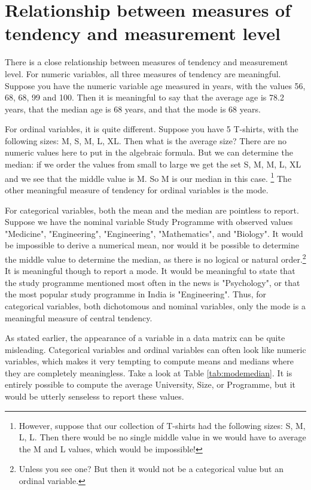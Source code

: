 \documentclass[]{book}\usepackage[]{graphicx}\usepackage[]{color}
\begin{document}
\section{Relationship between measures of tendency and measurement level}

There is a close relationship between measures of tendency and measurement level. For numeric variables, all three measures of tendency are meaningful. Suppose you have the numeric variable age measured in years, with the values 56, 68, 68, 99 and 100. Then it is meaningful to say that the average age is 78.2 years, that the median age is 68 years, and that the mode is 68 years.

For ordinal variables, it is quite different. Suppose you have 5 T-shirts, with the following sizes: M, S, M, L, XL. Then what is the average size? There are no numeric values here to put in the algebraic formula. But we can determine the median: if we order the values from small to large we get the set S, M, M, L, XL and we see that the middle value is M. So M is our median in this case. \footnote{However, suppose that our collection of T-shirts had the following sizes: S, M, L, L. Then there would be no single middle value in we would have to average the M and L values, which would be impossible!} The other meaningful measure of tendency for ordinal variables is the mode.

For categorical variables, both the mean and the median are pointless to report. Suppose we have the nominal variable Study Programme with observed values "Medicine", "Engineering", "Engineering", "Mathematics", and "Biology". It would be impossible to derive a numerical mean, nor would it be possible to determine the middle value to determine the median, as there is no logical or natural order.\footnote{Unless you see one? But then it would not be a categorical value but an ordinal variable.} It is meaningful though to report a mode. It would be meaningful to state that the study programme mentioned most often in the news is "Psychology", or that the most popular study programme in India is "Engineering". Thus, for categorical variables, both dichotomous and nominal variables, only the mode is a meaningful measure of central tendency.

As stated earlier, the appearance of a variable in a data matrix can be quite misleading. Categorical variables and ordinal variables can often look like numeric variables, which makes it very tempting to compute means and medians where they are completely meaningless. Take a look at Table \ref{tab:modemedian}. It is entirely possible to compute the average University, Size, or Programme, but it would be utterly senseless to report these values.
\end{document}
